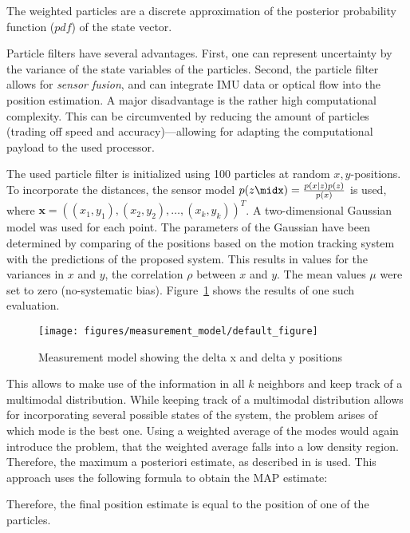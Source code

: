 The weighted particles are a discrete approximation of the posterior
probability function ($pdf$) of the state vector.

Particle filters have several advantages. First, one can represent
uncertainty by the variance of the state variables of the
particles. Second, the particle filter allows for \emph{sensor fusion}, and
can integrate IMU data or optical flow into the position estimation.
A major disadvantage is the rather high computational complexity. This
can be circumvented by reducing the amount of particles (trading off
speed and accuracy)---allowing for adapting the computational payload
to the used processor.

The used particle filter is initialized using 100 particles at random
$x, y$-positions. To incorporate the distances, the sensor model $p(z
\midx) = \frac{p(x \mid z)p(z)}{p(x)}$ is used, where $\textbf{x} =
((x_1, y_1), (x_2, y_2), \ldots, (x_k, y_k))^T$. A two-dimensional
Gaussian model was used for each point. The parameters of the Gaussian
have been determined by comparing of the positions based on the motion
tracking system with the predictions of the proposed system. This
results in values for the variances in $x$ and $y$, the correlation
$\rho$ between $x$ and $y$. The mean values $\mu$ were set to zero
(no-systematic bias). Figure~\ref{fig:measurementmodel} shows the
results of one such evaluation.

\begin{figure}[h!]
\begin{center}
\texttt{[image: figures/measurement\_model/default\_figure]}
\caption{{\label{fig:measurementmodel} Measurement model showing the delta x and delta y
    positions%
}}
\end{center}
\end{figure}

This allows to make use of the information in all $k$ neighbors and
keep track of a multimodal distribution. While keeping track of a
multimodal distribution allows for incorporating several possible
states of the system, the problem arises of which mode is the best
one. Using a weighted average of the modes would again introduce the
problem, that the weighted average falls into a low density
region. Therefore, the maximum a posteriori estimate, as described in
\cite{driessen2008map} is used. This approach uses the following
formula to obtain the MAP estimate:

Therefore, the final position estimate is equal to the position of one
of the particles.

